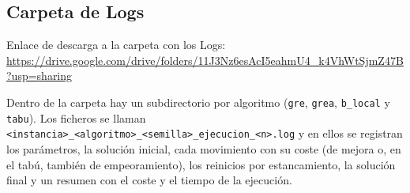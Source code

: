 \documentclass[a4paper,12pt]{article}
\begin{document}
\renewcommand{\listfigurename}{Índice de Figuras}
\renewcommand{\listtablename}{Índice de Tablas}

\listoffigures
\listoftables
\clearpage



\clearpage

\begin{appendices}
  \appendixpage           %
  \addappheadtotoc        %

  \section{Carpeta de Logs}
Enlace de descarga a la carpeta con los Logs: \url{https://drive.google.com/drive/folders/11J3Nz6esAcI5eahmU4_k4VhWtSjmZ47B?usp=sharing}

Dentro de la carpeta hay un subdirectorio por algoritmo (\texttt{gre}, \texttt{grea}, \texttt{b\_local} y \texttt{tabu}). Los ficheros se llaman \texttt{<instancia>\_<algoritmo>\_<semilla>\_ejecucion\_<n>.log} y en ellos se registran los parámetros, la solución inicial, cada movimiento con su coste (de mejora o, en el tabú, también de empeoramiento), los reinicios por estancamiento, la solución final y un resumen con el coste y el tiempo de la ejecución.

\end{appendices}
\end{document}
